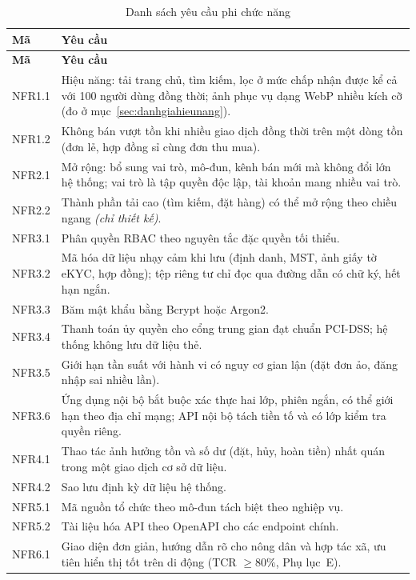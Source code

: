 \begingroup
\tblsetup\tblzebra
\begin{longtable}{L{1.40cm} L{13.50cm}}
\caption{Danh sách yêu cầu phi chức năng}
\label{tab:nfr} \\
\toprule
{}
\textbf{Mã} & \textbf{Yêu cầu} \\
\midrule
\endfirsthead
\toprule
{}
\textbf{Mã} & \textbf{Yêu cầu} \\
\midrule
\endhead
\bottomrule
\endfoot
NFR1.1 & Hiệu năng: tải trang chủ, tìm kiếm, lọc ở mức chấp nhận được kể cả với 100 người dùng đồng thời; ảnh phục vụ dạng WebP nhiều kích cỡ (đo ở mục~\ref{sec:danhgiahieunang}). \\
NFR1.2 & Không bán vượt tồn khi nhiều giao dịch đồng thời trên một dòng tồn (đơn lẻ, hợp đồng sỉ cùng đơn thu mua). \\
NFR2.1 & Mở rộng: bổ sung vai trò, mô-đun, kênh bán mới mà không đổi lớn hệ thống; vai trò là tập quyền độc lập, tài khoản mang nhiều vai trò. \\
NFR2.2 & Thành phần tải cao (tìm kiếm, đặt hàng) có thể mở rộng theo chiều ngang \emph{(chỉ thiết kế)}. \\
NFR3.1 & Phân quyền RBAC theo nguyên tắc đặc quyền tối thiểu. \\
NFR3.2 & Mã hóa dữ liệu nhạy cảm khi lưu (định danh, MST, ảnh giấy tờ eKYC, hợp đồng); tệp riêng tư chỉ đọc qua đường dẫn có chữ ký, hết hạn ngắn. \\
NFR3.3 & Băm mật khẩu bằng Bcrypt hoặc Argon2. \\
NFR3.4 & Thanh toán ủy quyền cho cổng trung gian đạt chuẩn PCI-DSS; hệ thống không lưu dữ liệu thẻ. \\
NFR3.5 & Giới hạn tần suất với hành vi có nguy cơ gian lận (đặt đơn ảo, đăng nhập sai nhiều lần). \\
NFR3.6 & Ứng dụng nội bộ bắt buộc xác thực hai lớp, phiên ngắn, có thể giới hạn theo địa chỉ mạng; API nội bộ tách tiền tố và có lớp kiểm tra quyền riêng. \\
NFR4.1 & Thao tác ảnh hưởng tồn và số dư (đặt, hủy, hoàn tiền) nhất quán trong một giao dịch cơ sở dữ liệu. \\
NFR4.2 & Sao lưu định kỳ dữ liệu hệ thống. \\
NFR5.1 & Mã nguồn tổ chức theo mô-đun tách biệt theo nghiệp vụ. \\
NFR5.2 & Tài liệu hóa API theo OpenAPI cho các endpoint chính. \\
NFR6.1 & Giao diện đơn giản, hướng dẫn rõ cho nông dân và hợp tác xã, ưu tiên hiển thị tốt trên di động (TCR $\ge 80\%$, Phụ lục~E). \\

\end{longtable}
